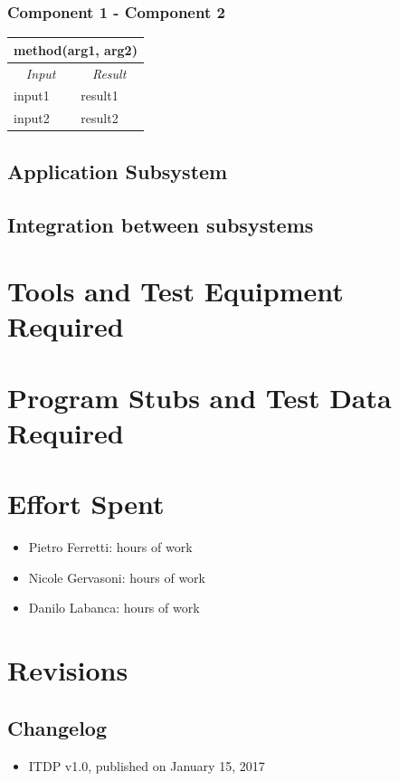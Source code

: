 \documentclass[english]{article}
\begin{document}
\subsubsection{Component 1 - Component 2}

\begin{center}
	\begin{tabular}{ | m{6cm} | m{6cm} | }
		\hline 
		\multicolumn{2}{|c|}{\textbf{method(arg1, arg2)}} \\
		\hline
		\multicolumn{1}{|c|}{\textit{Input}} & \multicolumn{1}{c|}{\textit{Result}} \\
		\hline
		input1 & result1 \\
		\hline
		input2 & result2 \\
		\hline
	\end{tabular}
\end{center}

\subsection{Application Subsystem}

\subsection{Integration between subsystems}

\section{Tools and Test Equipment Required}

\section{Program Stubs and Test Data Required}


\section{Effort Spent}
\begin{itemize}
	\item{Pietro Ferretti:  hours of work}
	\item{Nicole Gervasoni:  hours of work}
	\item{Danilo Labanca:  hours of work}
\end{itemize}


\section{Revisions}

\subsection{Changelog}
\begin{itemize}
	\item{ITDP v1.0, published on January 15, 2017}
\end{itemize}
\end{document}
